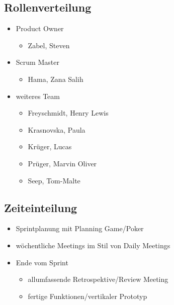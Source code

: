\documentclass[a4paper, 11pt]{article}
\begin{document}
\subsection{Rollenverteilung}
\begin{itemize}
    \item Product Owner
    \begin{itemize}
        \item Zabel, Steven
    \end{itemize}
    \item Scrum Master
    \begin{itemize}
        \item Hama, Zana Salih
    \end{itemize}
    \item weiteres Team 
    \begin{itemize}
        \item Freyschmidt, Henry Lewis
        \item Krasnovska, Paula
        \item Krüger, Lucas
        \item Prüger, Marvin Oliver
        \item Seep, Tom-Malte
    \end{itemize}
\end{itemize}
\subsection{Zeiteinteilung}
\begin{itemize}
    \item Sprintplanung mit Planning Game/Poker
    \item wöchentliche Meetings im Stil von Daily Meetings
    \item Ende vom Sprint
    \begin{itemize}
        \item allumfassende Retrospektive/Review Meeting
        \item fertige Funktionen/vertikaler Prototyp
    \end{itemize}
\end{itemize}
\end{document}

